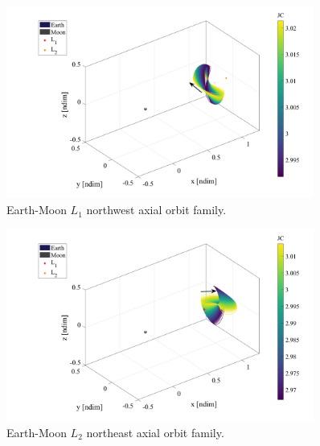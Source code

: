 \begin{figure}[H]
    \centering
    \includegraphics[width=0.9\textwidth]{figures/L1AxialFamily.pdf}
    \caption{Earth-Moon $L_{1}$ northwest axial orbit family.}
    \label{fig:L1Axial}
\end{figure}

\begin{figure}[H]
    \centering
    \includegraphics[width=0.9\textwidth]{figures/L2AxialFamily.pdf}
    \caption{Earth-Moon $L_{2}$ northeast axial orbit family.}
    \label{fig:L2Axial}
\end{figure}

